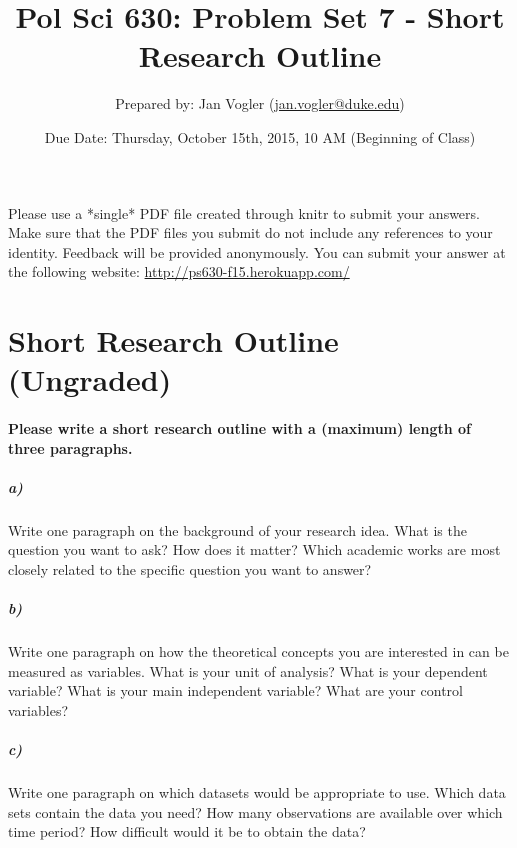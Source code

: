 \documentclass[12pt]{article}
\begin{document}
\title{Pol Sci 630: Problem Set 7 - Short Research Outline}

\author{Prepared by: Jan Vogler (\href{mailto:jan.vogler@duke.edu}{jan.vogler@duke.edu})}

\date{Due Date: Thursday, October 15th, 2015, 10 AM (Beginning of Class)}
 
\maketitle 



Please use a *single* PDF file created through knitr to submit your answers. Make sure that the PDF files you submit do not include any references to your identity. Feedback will be provided anonymously. You can submit your answer at the following website: \url{http://ps630-f15.herokuapp.com/}



\section*{Short Research Outline (Ungraded)}

\paragraph{Please write a short research outline with a (maximum) length of three paragraphs.}

\subparagraph{a)} Write one paragraph on the background of your research idea. What is the question you want to ask? How does it matter? Which academic works are most closely related to the specific question you want to answer?

\subparagraph{b)} Write one paragraph on how the theoretical concepts you are interested in can be measured as variables. What is your unit of analysis? What is your dependent variable? What is your main independent variable? What are your control variables?

\subparagraph{c)} Write one paragraph on which datasets would be appropriate to use. Which data sets contain the data you need? How many observations are available over which time period? How difficult would it be to obtain the data?
\end{document}
